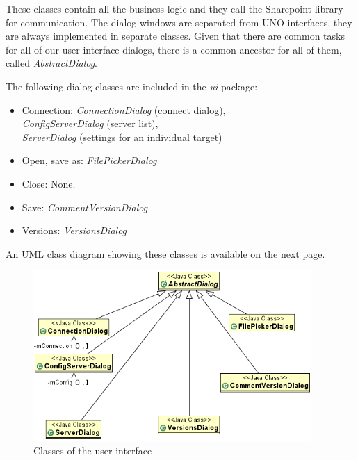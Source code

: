 These classes contain all the business logic and they call the Sharepoint
library for communication. The dialog windows are separated from UNO
interfaces, they are always implemented in separate classes. Given that there
are common tasks for all of our user interface dialogs, there is a common
ancestor for all of them, called \emph{AbstractDialog}.

The following dialog classes are included in the \emph{ui} package:

\begin{itemize}
\item Connection: \emph{ConnectionDialog} (connect dialog), \\
\emph{ConfigServerDialog} (server list), \\ \emph{ServerDialog} (settings for an
individual target)
\item Open, save as: \emph{FilePickerDialog}
\item Close: None.
\item Save: \emph{CommentVersionDialog}
\item Versions: \emph{VersionsDialog}
\end{itemize}

An UML class diagram showing these classes is available on the next page.

\begin{figure}[p]
\centering
\includegraphics[width=400px,keepaspectratio]{design-spui.png}
\caption{Classes of the user interface}
\end{figure}
